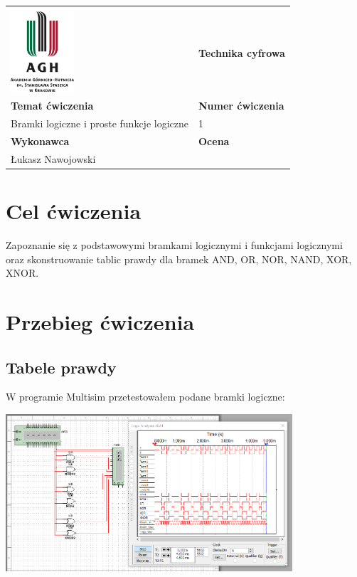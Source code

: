 \documentclass[12pt,a4paper]{article}
\begin{document}
\begin{table}[]
\label{my-label}
\begin{tabular}{|p{7.5cm}|p{7.5cm}|}
\hline
									           					&                           \\
\includegraphics[height=3cm]{logo}             					& \textbf{Technika cyfrowa} \\ \hline
\multicolumn{1}{|l|}{\textbf{Temat ćwiczenia}} 					& \textbf{Numer ćwiczenia}  \\
\multicolumn{1}{|l|}{Bramki logiczne i proste funkcje logiczne}	& 1                         \\ \hline
\multicolumn{1}{|l|}{\textbf{Wykonawca}}       & \textbf{Ocena}            \\
\multicolumn{1}{|l|}{Łukasz Nawojowski}          &                           \\ \hline
\end{tabular}
\end{table}

\section{Cel ćwiczenia}

Zapoznanie się z podstawowymi bramkami logicznymi i funkcjami logicznymi oraz skonstruowanie tablic prawdy dla bramek AND, OR, NOR, NAND, XOR, XNOR.



\section{Przebieg ćwiczenia}

\subsection{Tabele prawdy}
W programie Multisim przetestowałem podane bramki logiczne:

\begin{center}
\includegraphics[width=0.8\textwidth]{logic_analyzer/two_way_gates}
\end{center}
\end{document}
